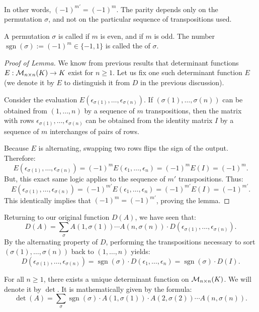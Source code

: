 In other words, $(-1)^{m'} = (-1)^m$. The parity depends only on the permutation $\sigma$, and not on the particular sequence of transpositions used.

A permutation $\sigma$ is called  if $m$ is even, and  if $m$ is odd. The number $\operatorname{sgn}(\sigma) := (-1)^m \in \{-1, 1\}$ is called the  of $\sigma$.

\begin{proof}[Proof of Lemma]
  We know from previous results that determinant functions $E : \mathcal{M}_{n \times n}(K) \to K$ exist for $n \ge 1$. Let us fix one such determinant function $E$ (we denote it by $E$ to distinguish it from $D$ in the previous discussion).

  Consider the evaluation $E(\epsilon_{\sigma(1)}, \dots, \epsilon_{\sigma(n)})$. If $(\sigma(1), \dots, \sigma(n))$ can be obtained from $(1, \dots, n)$ by a sequence of $m$ transpositions, then the matrix with rows $\epsilon_{\sigma(1)}, \dots, \epsilon_{\sigma(n)}$ can be obtained from the identity matrix $I$ by a sequence of $m$ interchanges of pairs of rows.

  Because $E$ is alternating, swapping two rows flips the sign of the output. Therefore:
  \[
  E(\epsilon_{\sigma(1)}, \dots, \epsilon_{\sigma(n)}) = (-1)^m E(\epsilon_1, \dots, \epsilon_n) = (-1)^m E(I) = (-1)^m.
  \]
  But, this exact same logic applies to the sequence of $m'$ transpositions. Thus:
  \[
  E(\epsilon_{\sigma(1)}, \dots, \epsilon_{\sigma(n)}) = (-1)^{m'} E(\epsilon_1, \dots, \epsilon_n) = (-1)^{m'} E(I) = (-1)^{m'}.
  \]
  This identically implies that $(-1)^m = (-1)^{m'}$, proving the lemma.
\end{proof}

Returning to our original function $D(A)$, we have seen that:
\[
D(A) = \sum_{\sigma} A(1,\sigma(1)) \cdots A(n,\sigma(n)) \cdot D(\epsilon_{\sigma(1)}, \dots, \epsilon_{\sigma(n)}).
\]
By the alternating property of $D$, performing the transpositions necessary to sort $(\sigma(1), \dots, \sigma(n))$ back to $(1, \dots, n)$ yields:
\begin{equation} \label{eq:det_relation}
  D(\epsilon_{\sigma(1)}, \dots, \epsilon_{\sigma(n)}) = \operatorname{sgn}(\sigma) \cdot D(\epsilon_1, \dots, \epsilon_n) = \operatorname{sgn}(\sigma) \cdot D(I).
\end{equation}

\begin{theorem}
  \label{thm:unique_det}
  For all $n \ge 1$, there exists a unique determinant function on $\mathcal{M}_{n \times n}(K)$. We will denote it by $\det$. It is mathematically given by the formula:
  \[
  \det(A) = \sum_{\sigma} \operatorname{sgn}(\sigma) \cdot A(1,\sigma(1)) \cdot A(2,\sigma(2)) \cdots A(n,\sigma(n)).
  \]
\end{theorem}

